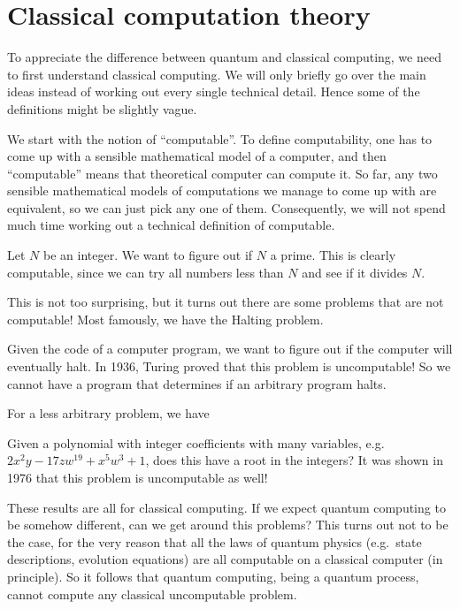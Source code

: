 \documentclass[a4paper]{article}
\begin{document}
\section{Classical computation theory}
To appreciate the difference between quantum and classical computing, we need to first understand classical computing. We will only briefly go over the main ideas instead of working out every single technical detail. Hence some of the definitions might be slightly vague.

We start with the notion of ``computable''. To define computability, one has to come up with a sensible mathematical model of a computer, and then ``computable'' means that theoretical computer can compute it. So far, any two sensible mathematical models of computations we manage to come up with are equivalent, so we can just pick any one of them. Consequently, we will not spend much time working out a technical definition of computable.

\begin{eg}
  Let $N$ be an integer. We want to figure out if $N$ a prime. This is clearly computable, since we can try all numbers less than $N$ and see if it divides $N$.
\end{eg}

This is not too surprising, but it turns out there are some problems that are not computable! Most famously, we have the Halting problem.
\begin{eg}
  Given the code of a computer program, we want to figure out if the computer will eventually halt. In 1936, Turing proved that this problem is uncomputable! So we cannot have a program that determines if an arbitrary program halts.
\end{eg}

For a less arbitrary problem, we have
\begin{eg}
  Given a polynomial with integer coefficients with many variables, e.g.\ $2x^2 y - 17 zw^{19} + x^5 w^3 + 1$, does this have a root in the integers? It was shown in 1976 that this problem is uncomputable as well!
\end{eg}

These results are all for classical computing. If we expect quantum computing to be somehow different, can we get around this problems? This turns out not to be the case, for the very reason that all the laws of quantum physics (e.g.\ state descriptions, evolution equations) are all computable on a classical computer (in principle). So it follows that quantum computing, being a quantum process, cannot compute any classical uncomputable problem.
\end{document}
